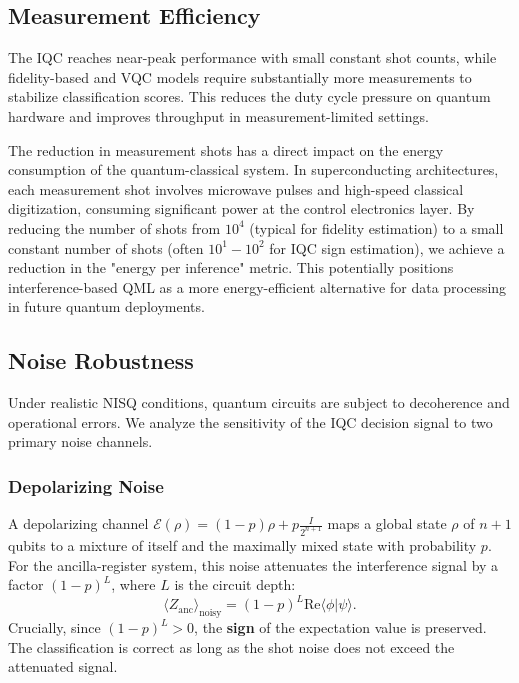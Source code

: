 \documentclass[conference]{IEEEtran}
\begin{document}
\subsection{Measurement Efficiency}
The IQC reaches near-peak performance with small constant shot counts, while fidelity-based and VQC models require substantially more measurements to stabilize classification scores. This reduces the duty cycle pressure on quantum hardware and improves throughput in measurement-limited settings.

The reduction in measurement shots has a direct impact on the energy consumption of the quantum-classical system. In superconducting architectures, each measurement shot involves microwave pulses and high-speed classical digitization, consuming significant power at the control electronics layer. By reducing the number of shots from $10^4$ (typical for fidelity estimation) to a small constant number of shots (often $10^1-10^2$ for IQC sign estimation), we achieve a reduction in the "energy per inference" metric. This potentially positions interference-based QML as a more energy-efficient alternative for data processing in future quantum deployments.

\subsection{Noise Robustness}
Under realistic NISQ conditions, quantum circuits are subject to decoherence and operational errors. We analyze the sensitivity of the IQC decision signal to two primary noise channels.

\subsubsection{Depolarizing Noise}
A depolarizing channel $\mathcal{E}(\rho) = (1-p)\rho + p\frac{I}{2^{n+1}}$ maps a global state $\rho$ of $n+1$ qubits to a mixture of itself and the maximally mixed state with probability $p$. For the ancilla-register system, this noise attenuates the interference signal by a factor $(1-p)^L$, where $L$ is the circuit depth:
\begin{equation}
    \langle Z_{\text{anc}} \rangle_{\text{noisy}} = (1-p)^L \mathrm{Re}\langle \phi | \psi \rangle.
\end{equation}
Crucially, since $(1-p)^L > 0$, the \textbf{sign} of the expectation value is preserved. The classification is correct as long as the shot noise does not exceed the attenuated signal.
\end{document}
